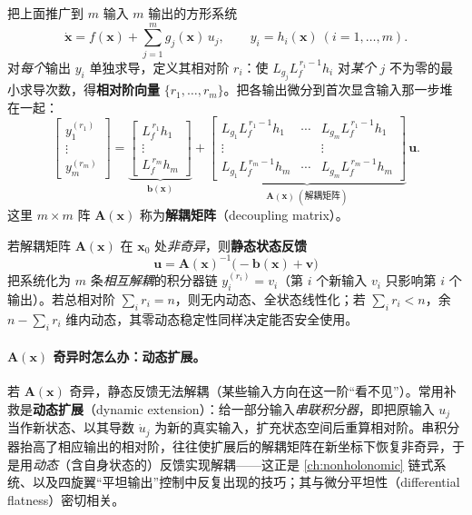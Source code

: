 把上面推广到 $m$ 输入 $m$ 输出的方形系统
\begin{equation}
  \dot{\mathbf{x}}=f(\mathbf{x})+\sum_{j=1}^{m} g_j(\mathbf{x})\,u_j,\qquad y_i=h_i(\mathbf{x})\ (i=1,\dots,m).
  \label{eq:fbl-mimo-sys}
\end{equation}
对\emph{每个}输出 $y_i$ 单独求导，定义其相对阶 $r_i$：使 $L_{g_j}L_f^{\,r_i-1}h_i$ 对\emph{某个} $j$ 不为零的最小求导次数，得\textbf{相对阶向量} $\{r_1,\dots,r_m\}$。把各输出微分到首次显含输入那一步堆在一起：
\begin{equation}
  \begin{bmatrix} y_1^{(r_1)}\\ \vdots\\ y_m^{(r_m)}\end{bmatrix}
  =\underbrace{\begin{bmatrix} L_f^{\,r_1}h_1\\ \vdots\\ L_f^{\,r_m}h_m\end{bmatrix}}_{\mathbf{b}(\mathbf{x})}
  +\underbrace{\begin{bmatrix} L_{g_1}L_f^{\,r_1-1}h_1 & \cdots & L_{g_m}L_f^{\,r_1-1}h_1\\ \vdots & & \vdots\\ L_{g_1}L_f^{\,r_m-1}h_m & \cdots & L_{g_m}L_f^{\,r_m-1}h_m\end{bmatrix}}_{\mathbf{A}(\mathbf{x})\ (\text{解耦矩阵})}\,\mathbf{u}.
  \label{eq:fbl-mimo-decoupling}
\end{equation}
这里 $m\times m$ 阵 $\mathbf{A}(\mathbf{x})$ 称为\textbf{解耦矩阵}（decoupling matrix）。

\begin{theorem}
\label{thm:fbl-mimo-decouple}
若解耦矩阵 $\mathbf{A}(\mathbf{x})$ 在 $\mathbf{x}_0$ 处\emph{非奇异}，则\textbf{静态状态反馈}
\begin{equation}
  \mathbf{u}=\mathbf{A}(\mathbf{x})^{-1}\big(-\mathbf{b}(\mathbf{x})+\mathbf{v}\big)
  \label{eq:fbl-mimo-law}
\end{equation}
把系统化为 $m$ 条\emph{相互解耦}的积分器链 $y_i^{(r_i)}=v_i$（第 $i$ 个新输入 $v_i$ 只影响第 $i$ 个输出）。若总相对阶 $\sum_i r_i=n$，则无内动态、全状态线性化；若 $\sum_i r_i<n$，余 $n-\sum_i r_i$ 维内动态，其零动态稳定性同样决定能否安全使用。
\end{theorem}

\paragraph{$\mathbf{A}(\mathbf{x})$ 奇异时怎么办：动态扩展。}
若 $\mathbf{A}(\mathbf{x})$ 奇异，静态反馈无法解耦（某些输入方向在这一阶“看不见”）。常用补救是\textbf{动态扩展}（dynamic extension）：给一部分输入\emph{串联积分器}，即把原输入 $u_j$ 当作新状态、以其导数 $\dot u_j$ 为新的真实输入，扩充状态空间后重算相对阶。串积分器抬高了相应输出的相对阶，往往使扩展后的解耦矩阵在新坐标下恢复非奇异，于是用\emph{动态}（含自身状态的）反馈实现解耦——这正是 \cref{ch:nonholonomic} 链式系统、以及四旋翼“平坦输出”控制中反复出现的技巧；其与微分平坦性（differential flatness）密切相关。

